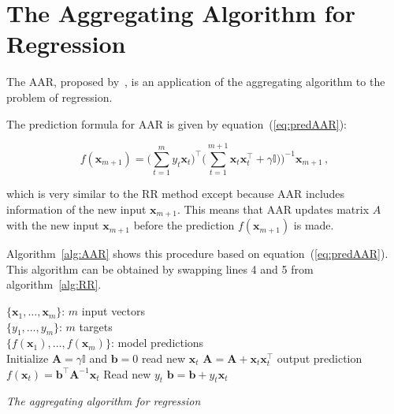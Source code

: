 \section{The Aggregating Algorithm for Regression}

The AAR, proposed by~\cite{vovk2001}, is an application of the
aggregating algorithm to the problem of regression. 

The prediction formula for AAR is given by
equation~(\ref{eq:predAAR}):

\begin{equation}
\label{eq:predAAR}
f(\mathbf{x}_{m+1}) = \displaystyle \big( \sum_{t=1}^m y_t \mathbf{x}_t \big )^\intercal 
  \big ( \sum_{t=1}^{m+1} \mathbf{x}_t \mathbf{x}_t  ^\intercal + \gamma
\mathbb{I})\big )^{-1}  \mathbf{x}_{m+1} \, ,
\end{equation}

\noindent which is very similar to the RR method except because AAR includes
information of the new input $\mathbf{x}_{m+1}$.  This means that AAR
updates matrix $A$ with the new input $\mathbf{x}_{m+1}$ before the
prediction $f(\mathbf{x}_{m+1})$ is made.

Algorithm~\ref{alg:AAR} shows this procedure based on
equation~(\ref{eq:predAAR}). This algorithm can be obtained by swapping lines 4 and 5 from
algorithm~\ref{alg:RR}. 


\begin{algorithm}[ht]
\begin{algorithmic}[1]
\REQUIRE $\,$ \\
$\{\mathbf{x}_1,\dots,\mathbf{x}_m \}$: $m$ input vectors \\
$\{y_1,\dots,y_m \}$: $m$ targets \\
\ENSURE  $\,$ \\
$\{f(\mathbf{x}_1),\dots,f(\mathbf{x}_m) \}$: model predictions \\
\STATE Initialize $\mathbf{A}=\gamma \mathbb{I}$
and $\mathbf{b}=0$
   	\STATE read new $\mathbf{x}_t$
	\STATE $\mathbf{A} = \mathbf{A} + \mathbf{x}_t \mathbf{x}_t^\intercal$
	\STATE output prediction $f(\mathbf{x}_t) =  \mathbf{b}^\intercal \mathbf{A}^{-1}\mathbf{x}_t$
   	\STATE Read new $y_t$
    	\STATE $\mathbf{b} = \mathbf{b} + y_t \mathbf{x}_t$
\ENDFOR

\end{algorithmic}
\caption{{\em The aggregating algorithm for regression}}
\label{alg:AAR}
\end{algorithm}



